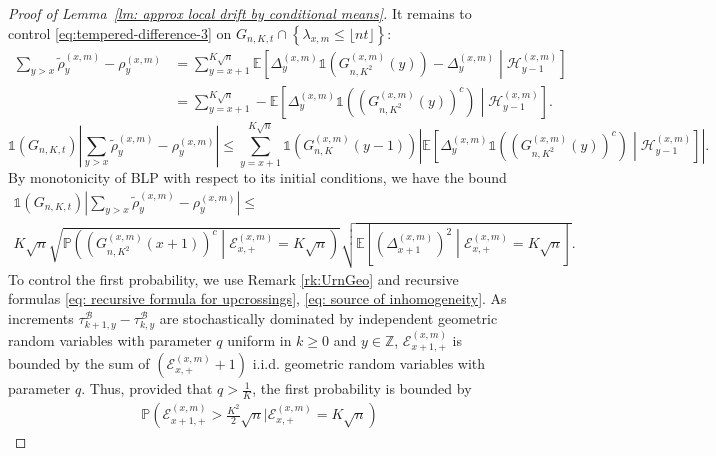 \documentclass[EJP]{ejpecp} %
\begin{document}
\begin{proof}[Proof of Lemma~\ref{lm: approx local drift by conditional means}]
	It remains to control  \eqref{eq:tempered-difference-3} on $G_{n, K, t} \cap \left\{\lambda_{x,m} \leq\lfloor nt \rfloor \right\}$:
	\begin{align*}
		\sum_{y > x} \tilde\rho_y^{(x,m)} - \rho_y^{(x,m)}
		&= \sum_{y = x + 1}^{K \sqrt{n} } \mathbb{E}\left[ \Delta_y^{(x,m)}\mathbb{1}\left( G_{n, K^2}^{(x,m)}(y) \right) - \Delta_{y}^{(x,m)} \middle| \mathcal{H}_{y-1}^{(x,m)}  \right]  \\
		&= \sum_{y = x + 1}^{K \sqrt{n} } -\mathbb{E}\left[ \Delta_y^{(x,m)}\mathbb{1}\left( \left( G_{n, K^2}^{(x,m)}(y) \right) ^c \right) \middle| \mathcal{H}_{y-1}^{(x,m)}  \right]
		.\end{align*}
	\[
	\mathbb{1}(G_{n, K, t}) \left| 
	\sum_{y > x} \tilde\rho_y^{(x,m)} - \rho_y^{(x,m)}
	\right| 
	\le  \sum_{y = x + 1}^{K \sqrt{n} } \mathbb{1}\left(G_{n, K}^{(x,m)}(y-1)\right) 
	\left|  \mathbb{E}\left[ \Delta_y^{(x,m)}\mathbb{1}\left( \left( G_{n, K^2}^{(x,m)}(y) \right) ^c \right) \middle| \mathcal{H}_{y-1}^{(x,m)}  \right] \right| 
	.\] 
	By monotonicity of BLP with respect to its initial conditions, we have the bound
	\begin{multline*}
		\mathbb{1}(G_{n, K, t})
		\left| \sum_{y > x} \tilde\rho_y^{(x,m)} - \rho_y^{(x,m)} \right| \le \\
		K \sqrt{n} 
		\sqrt{ \mathbb{P}\left( \left( G^{(x,m)}_{n, K^2}(x+1) \right) ^{c} \middle| \mathcal{E}_{x,+}^{(x,m)} = K \sqrt{n}  \right) }
		\sqrt{ \mathbb{E}\left[ \left(\Delta_{x+1}^{(x,m)}\right)^2 \middle| \mathcal{E}_{x,+}^{(x,m)} = K \sqrt{n}  \right]}
		.\end{multline*}
	To control the first probability, we use Remark \ref{rk:UrnGeo} and recursive formulas \eqref{eq: recursive formula for upcrossings}, \eqref{eq: source of inhomogeneity}. As increments $\tau^{\mathcal{B}}_{k+1,y} -\tau^{\mathcal{B}}_{k,y}$ are stochastically dominated by independent geometric random variables with parameter $q$ uniform in $ k \geq 0$ and $y \in \mathbb{Z}$, $\mathcal{E}_{x+1,+}^{(x,m)}$ is bounded by the sum of $ (\mathcal{E}_{x,+}^{(x,m)} +1) $ i.i.d. geometric random variables with parameter $q$. 
	Thus, provided that $q> \frac{1}{K}$, the first probability is bounded by
	\begin{align*}
		\mathbb{P}\left(\mathcal{E}_{x+1,+}^{(x,m)} > \frac{K^2}{2} \sqrt{n} | \mathcal{E}_{x,+}^{(x, m)} = K \sqrt{n}\right)

\end{align*}
\end{proof}
\end{document}
